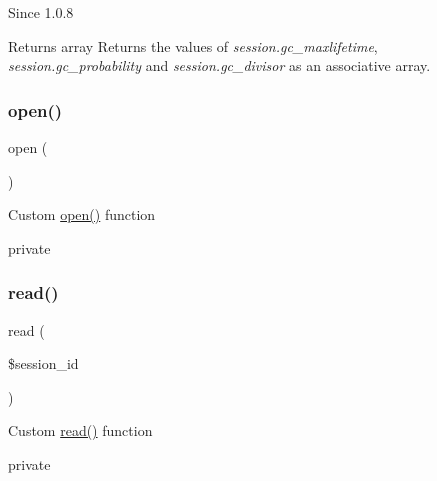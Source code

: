 {\ttfamily 
\begin{DoxyPre}\begin{DoxySince}{Since}
1.0.8
\end{DoxySince}
\begin{DoxyReturn}{Returns}
array   Returns the values of {\itshape session.gc\_maxlifetime}, {\itshape session.gc\_probability} and {\itshape session.gc\_divisor}
                as an associative array.

\end{DoxyReturn}
\end{DoxyPre}
}\mbox{\label{class_zebra___session_a44a2ac59a3b91f8c18905dce700934d6}} 
\subsubsection{\texorpdfstring{open()}{open()}}
{\footnotesize\ttfamily open (\begin{DoxyParamCaption}{ }\end{DoxyParamCaption})}

Custom \mbox{\hyperlink{class_zebra___session_a44a2ac59a3b91f8c18905dce700934d6}{open()}} function

private \mbox{\label{class_zebra___session_a5bbf84ebf657be4eaccc0582377c76bf}} 
\subsubsection{\texorpdfstring{read()}{read()}}
{\footnotesize\ttfamily read (\begin{DoxyParamCaption}\item[{}]{\$session\+\_\+id }\end{DoxyParamCaption})}

Custom \mbox{\hyperlink{class_zebra___session_a5bbf84ebf657be4eaccc0582377c76bf}{read()}} function

private \mbox{\label{class_zebra___session_a55c3728e57cce5405330bd67c44906fb}} 

